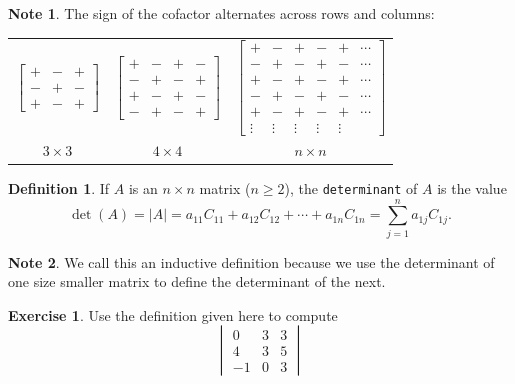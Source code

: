 \documentclass[handout]{beamer}
\newcommand{\fn}{\insertframenumber}
\theoremstyle{definition}
\newtheorem{exercise}{Exercise}
\newtheorem*{defn}{Definition}
\newtheorem*{nb}{Note}
\renewcommand{\emph}[1]{{\color{blue}\texttt{#1}}}
\begin{document}
\begin{frame}{\fn}
	\begin{nb}
		The sign of the cofactor alternates across rows and columns:
		\begin{center}
			\begin{tabular}{ccc}
			$\begin{bmatrix}+&-&+\\-&+&-\\+&-&+\end{bmatrix}$&
			
			$\begin{bmatrix}+&-&+&-\\-&+&-&+\\+&-&+&-\\-&+&-&+\end{bmatrix}$&
			
			$\begin{bmatrix}+&-&+&-&+&\cdots\\-&+&-&+&-&\cdots\\+&-&+&-&+&\cdots\\
			-&+&-&+&-&\cdots\\+&-&+&-&+&\cdots\\\vdots&\vdots&\vdots&\vdots&\vdots&\end{bmatrix}$\\
			$3\times 3$&$4\times 4$ & $n\times n$
		\end{tabular}
		\end{center}
	\end{nb}
\end{frame}
\begin{frame}{\fn}
	\begin{defn}
		If $A$ is an $n\times n$ matrix ($n\geq 2$), the \emph{determinant} of $A$ is the value
			\[\det(A)=|A|=a_{11}C_{11}+a_{12}C_{12}+\cdots+a_{1n}C_{1n}=\sum_{j=1}^n a_{1j}C_{1j}.\]
	\end{defn}
	\begin{nb}
		We call this an inductive definition because we use the determinant of one size smaller matrix to define the determinant of the next.
	\end{nb}
	\begin{exercise}
		Use the definition given here to compute	
			\[\begin{vmatrix}
			0 & 3 & 3 \\
			4 & 3 & 5 \\
			-1 & 0 & 3
			\end{vmatrix}\]
	\end{exercise}
\end{frame}
\end{document}
